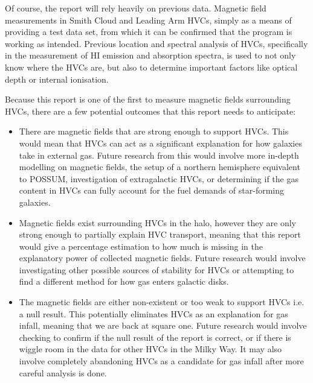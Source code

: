 Of course, the report will rely heavily on previous data. Magnetic field measurements in Smith Cloud and Leading Arm HVCs, simply as a means of providing a test data set, from which it can be confirmed that the program is working as intended. Previous location and spectral analysis of HVCs, specifically in the measurement of HI emission and absorption spectra, is used to not only know where the HVCs are, but also to determine important factors like optical depth or internal ionisation.

Because this report is one of the first to measure magnetic fields surrounding HVCs, there are a few potential outcomes that this report needs to anticipate:
\begin{itemize}
\item There are magnetic fields that are strong enough to support HVCs. This would mean that HVCs can act as a significant explanation for how galaxies take in external gas. Future research from this would involve more in-depth modelling on magnetic fields, the setup of a northern hemisphere equivalent to POSSUM, investigation of extragalactic HVCs, or determining if the gas content in HVCs can fully account for the fuel demands of star-forming galaxies.
\item Magnetic fields exist surrounding HVCs in the halo, however they are only strong enough to partially explain HVC transport, meaning that this report would give a percentage estimation to how much is missing in the explanatory power of collected magnetic fields. Future research would involve investigating other possible sources of stability for HVCs or attempting to find a different method for how gas enters galactic disks.
\item The magnetic fields are either non-existent or too weak to support HVCs i.e. a null result. This potentially eliminates HVCs as an explanation for gas infall, meaning that we are back at square one. Future research would involve checking to confirm if the null result of the report is correct, or if there is wiggle room in the data for other HVCs in the Milky Way. It may also involve completely abandoning HVCs as a candidate for gas infall after more careful analysis is done.
\end{itemize}